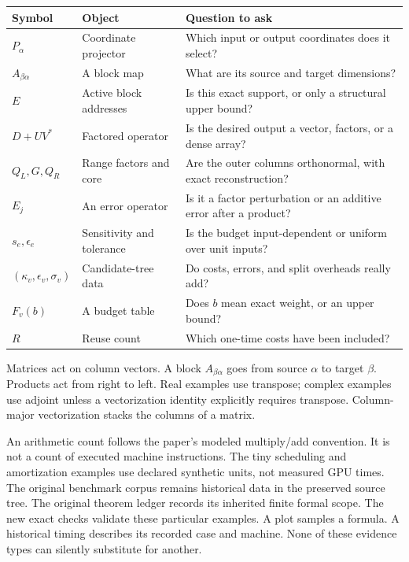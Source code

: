 \begin{tabularx}{\linewidth}{@{}p{.18\linewidth}p{.27\linewidth}Y@{}}\toprule
Symbol & Object & Question to ask \\\midrule
$P_\alpha$ & Coordinate projector & Which input or output coordinates does it select?\\
$A_{\beta\alpha}$ & A block map & What are its source and target dimensions?\\
$E$ & Active block addresses & Is this exact support, or only a structural upper bound?\\
$D+UV^*$ & Factored operator & Is the desired output a vector, factors, or a dense array?\\
$Q_L,G,Q_R$ & Range factors and core & Are the outer columns orthonormal, with exact reconstruction?\\
$E_j$ & An error operator & Is it a factor perturbation or an additive error after a product?\\
$s_e,\epsilon_e$ & Sensitivity and tolerance & Is the budget input-dependent or uniform over unit inputs?\\
$(\kappa_v,\epsilon_v,\sigma_v)$ & Candidate-tree data & Do costs, errors, and split overheads really add?\\
$F_v(b)$ & A budget table & Does $b$ mean exact weight, or an upper bound?\\
$R$ & Reuse count & Which one-time costs have been included?\\\bottomrule
\end{tabularx}
Matrices act on column vectors. A block $A_{\beta\alpha}$ goes from source $\alpha$ to target $\beta$. Products act from right to left. Real examples use transpose; complex examples use adjoint unless a vectorization identity explicitly requires transpose. Column-major vectorization stacks the columns of a matrix.

An arithmetic count follows the paper's modeled multiply/add convention. It is not a count of executed machine instructions. The tiny scheduling and amortization examples use declared synthetic units, not measured GPU times. The original benchmark corpus remains historical data in the preserved source tree.
The original theorem ledger records its inherited finite formal scope. The new exact checks validate these particular examples. A plot samples a formula. A historical timing describes its recorded case and machine. None of these evidence types can silently substitute for another.

